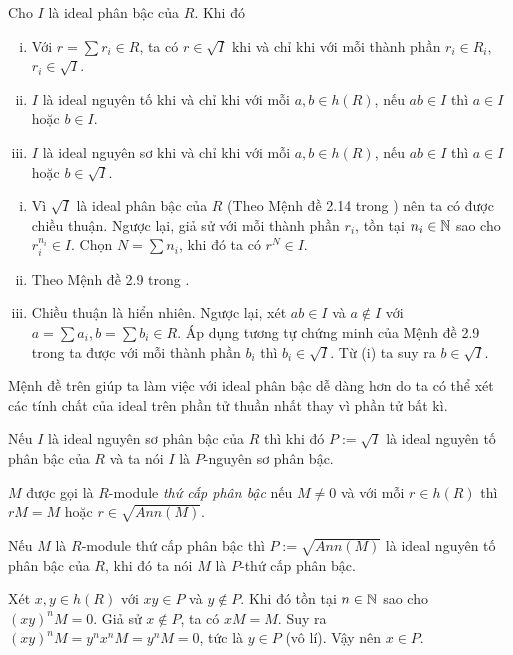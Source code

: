 \begin{proposition}
    Cho $I$ là ideal phân bậc của $R$. Khi đó
    \begin{enumerate}[(i)]
        \item Với $r = \sum r_i \in R$, ta có $r \in \sqrt{I}$ khi và chỉ khi với mỗi thành phần $r_i \in R_i$, $r_i \in \sqrt{I}$.
        \item $I$ là ideal nguyên tố khi và chỉ khi với mỗi $a,b \in h(R)$, nếu $ab \in I$ thì $a \in I$ hoặc $b \in I$.
        \item $I$ là ideal nguyên sơ khi và chỉ khi với mỗi $a,b \in h(R)$, nếu $ab \in I$ thì $a \in I$ hoặc $b \in \sqrt{I}$.
    \end{enumerate}
\end{proposition}
\startproof
\begin{enumerate}[(i)]
    \item Vì $\sqrt{I}$ là ideal phân bậc của $R$ (Theo Mệnh đề 2.14 trong \cite{GiaoTrinh}) nên ta có được chiều thuận. Ngược lại, giả sử với mỗi thành phần $r_i$, tồn tại $n_i \in \mathbb N$ sao cho $r_i^{n_i} \in I$. Chọn $N = \sum n_i$, khi đó ta có $r^N \in I$.
    \item Theo Mệnh đề 2.9 trong \cite{GiaoTrinh}.
    \item Chiều thuận là hiển nhiên. Ngược lại, xét $ab \in I$ và $a \notin I$ với $a = \sum a_i, b = \sum b_i \in R$. Áp dụng tương tự chứng minh của Mệnh đề 2.9 trong \cite{GiaoTrinh} ta được với mỗi thành phần $b_i$ thì $b_i \in \sqrt{I}$. Từ (i) ta suy ra $b \in \sqrt{I}$.\QED
\end{enumerate}
Mệnh đề trên giúp ta làm việc với ideal phân bậc dễ dàng hơn do ta có thể xét các tính chất của ideal trên phần tử thuần nhất thay vì phần tử bất kì.

\begin{remark}
    Nếu $I$ là ideal nguyên sơ phân bậc của $R$ thì khi đó $P := \sqrt{I}$ là ideal nguyên tố phân bậc của $R$ và ta nói $I$ là $P$-nguyên sơ phân bậc.
\end{remark}

\begin{define}
    $M$ được gọi là $R$-module \textit{thứ cấp phân bậc} nếu $M \neq 0$ và với mỗi $r \in h(R)$ thì $rM = M$ hoặc $r \in \sqrt{Ann(M)}$.
\end{define}

\begin{remark}
    Nếu $M$ là $R$-module thứ cấp phân bậc thì $P := \sqrt{Ann(M)}$ là ideal nguyên tố phân bậc của $R$, khi đó ta nói $M$ là $P$-thứ cấp phân bậc.
\end{remark}
\startproof Xét $x,y \in h(R)$ với $xy \in P$ và $y \notin P$. Khi đó tồn tại $n \in \mathbb N$ sao cho $(xy)^nM = 0$. Giả sử $x \notin P$, ta có $xM = M$. Suy ra $(xy)^nM = y^nx^nM = y^nM = 0$, tức là $y \in P$ (vô lí). Vậy nên $x \in P$. \QED

